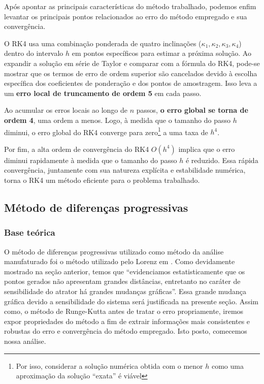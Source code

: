 \documentclass[12pt, a4paper]{article}
\begin{document}
    Após apontar as principais características do método trabalhado, podemos enfim levantar os principais pontos relacionados ao erro do método empregado e sua convergência.
    
    O RK4 usa uma combinação ponderada de quatro inclinações ($\kappa_1, \kappa_2, \kappa_3, \kappa_4$) dentro do intervalo $h$ em pontos específicos para estimar a próxima solução. Ao expandir a solução em série de Taylor e comparar com a fórmula do RK4, pode-se mostrar que os termos de erro de ordem superior são cancelados devido à escolha específica dos coeficientes de ponderação e dos pontos de amostragem. Isso leva a um \textbf{erro local de truncamento de ordem 5} em cada passo. 
    
    Ao acumular os erros locais ao longo de $n$ passos, \textbf{o erro global se torna de ordem 4}, uma ordem a menos. Logo, à medida que o tamanho do passo $h$ diminui, o erro global do RK4 converge para zero\footnote{Por isso, considerar a solução numérica obtida com o menor $h$ como uma aproximação da solução ``exata'' é viável} a uma taxa de $h^4$.
    
    Por fim, a  alta ordem de convergência do RK4 $O(h^4)$ implica que o erro diminui rapidamente à medida que o tamanho do passo $h$ é reduzido. Essa rápida convergência, juntamente com sua natureza explícita e estabilidade numérica, torna o RK4 um método eficiente para o problema trabalhado.
    
    
    \subsection{Método de diferenças progressivas}
    \subsubsection{Base teórica}
    O método de diferenças progressivas utilizado como método da análise manufaturado foi o método utilizado pelo Lorenz em \cite{Lorenz1963}. Como devidamente mostrado na seção anterior, temos que ``evidenciamos estatisticamente que os pontos gerados não apresentam grandes distâncias, entretanto no caráter de sensibilidade do atrator há grandes mudanças gráficas''. Essa grande mudança gráfica devido a sensibilidade do sistema será justificada na presente seção. Assim como, o método de Runge-Kutta antes de tratar o erro propriamente, iremos expor propriedades do método a fim de extrair informações mais consistentes e robustas do erro e convergência do método empregado. Isto posto, comecemos nossa análise.
    
\end{document}
